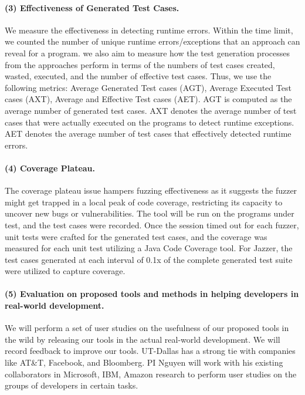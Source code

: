 \paragraph{\bf (3) Effectiveness of Generated Test Cases.}
We measure the effectiveness in detecting runtime errors. Within the
time limit, we counted the number of unique runtime errors/exceptions
that an approach can reveal for a program.  we also aim to measure how
the test generation processes from the approaches perform in terms of
the numbers of test cases created, wasted, executed, and the number of
effective test cases. Thus, we use the following metrics: Average
Generated Test cases (AGT), Average Executed Test cases (AXT), Average
and Effective Test cases (AET). AGT is computed as the average number
of generated test cases. AXT denotes the average
number of test cases that were actually executed on the programs to
detect runtime exceptions. AET denotes the average number of test
cases that effectively detected runtime errors.


\paragraph{\bf (4) Coverage Plateau.} The coverage plateau issue
hampers fuzzing effectiveness as it suggests the fuzzer might get
trapped in a local peak of code coverage, restricting its capacity to
uncover new bugs or vulnerabilities. The tool will be run on the
programs under test, and the test cases were recorded. Once the
session timed out for each fuzzer, unit tests were crafted for the
generated test cases, and the coverage was measured for each unit test
utilizing a Java Code Coverage tool.  For Jazzer, the test cases
generated at each interval of 0.1x of the complete generated test
suite were utilized to capture coverage.

\paragraph{\bf (5) Evaluation on proposed tools and methods in helping developers in real-world development.}

We will perform a set of user studies on the usefulness of our
proposed tools in the wild by releasing our
tools in the actual real-world development. 
We will record feedback to improve our tools.
UT-Dallas has a strong tie with companies like AT\&T, Facebook, and
Bloomberg. PI Nguyen will work with his existing collaborators in
Microsoft, IBM, Amazon research to perform user studies on the groups of
developers in certain tasks.
